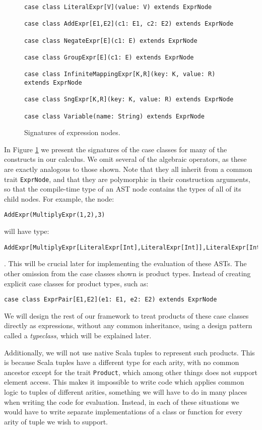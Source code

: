 \begin{figure}
\begin{lstlisting}
case class LiteralExpr[V](value: V) extends ExprNode

case class AddExpr[E1,E2](c1: E1, c2: E2) extends ExprNode

case class NegateExpr[E](c1: E) extends ExprNode

case class GroupExpr[E](c1: E) extends ExprNode

case class InfiniteMappingExpr[K,R](key: K, value: R) extends ExprNode

case class SngExpr[K,R](key: K, value: R) extends ExprNode

case class Variable(name: String) extends ExprNode

\end{lstlisting}
\caption{Signatures of expression nodes.}
\label{exprnodes}
\end{figure}

In Figure \ref{exprnodes} we present the signatures of the case classes for many of the constructs in our calculus. We omit several of the algebraic operators, as these are exactly analogous to those shown. Note that they all inherit from a common trait \lstinline{ExprNode}, and that they are polymorphic in their construction arguments, so that the compile-time type of an AST node contains the types of all of its child nodes. For example, the node:
\vs\begin{lstlisting}
AddExpr(MultiplyExpr(1,2),3)
\end{lstlisting}\vs
will have type:
\vs\begin{lstlisting}
AddExpr[MultiplyExpr[LiteralExpr[Int],LiteralExpr[Int]],LiteralExpr[Int]]
\end{lstlisting}\vs.
This will be crucial later for implementing the evaluation of these ASTs.
The other omission from the case classes shown is product types. Instead of creating explicit case classes for product types, such as:
\vs\begin{lstlisting}
case class ExprPair[E1,E2](e1: E1, e2: E2) extends ExprNode
\end{lstlisting}\vs
We will design the rest of our framework to treat products of these case classes directly as expressions, without any common inheritance, using a design pattern called a \textit{typeclass}, which will be explained later.

Additionally, we will not use native Scala tuples to represent such products. This is because Scala tuples have a different type for each arity, with no common ancestor except for the trait \lstinline{Product}, which among other things does not support element access. This makes it impossible to write code which applies common logic to tuples of different arities, something we will have to do in many places when writing the code for evaluation. Instead, in each of these situations we would have to write separate implementations of a class or function for every arity of tuple we wish to support.
	
